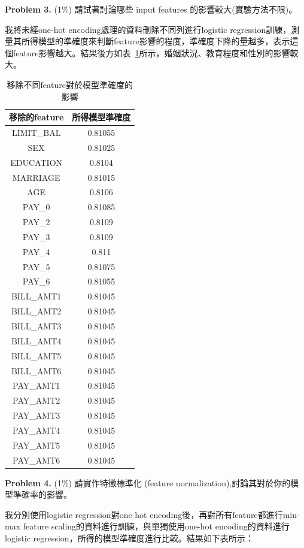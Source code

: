 \documentclass{article}
\begin{document}
\textbf{Problem 3.} (1\%) 請試著討論哪些 input features 的影響較大(實驗方法不限)。

我將未經one-hot encoding處理的資料刪除不同列進行logistic regression訓練，測量其所得模型的準確度來判斷feature影響的程度，準確度下降的量越多，表示這個feature影響越大。結果後方如表~\ref{table:feature_selection}所示，婚姻狀況、教育程度和性別的影響較大。

\begin{table}
\caption{移除不同feature對於模型準確度的影響}\label{table:feature_selection}
\begin{tabular}{|c|c|}
\hline
移除的feature & 所得模型準確度 \\
\hline
LIMIT\_BAL & 0.81055 \\
\hline
SEX & 0.81025 \\
\hline
EDUCATION & 0.8104 \\
\hline
MARRIAGE & 0.81015 \\
\hline
AGE & 0.8106 \\
\hline
PAY\_0 & 0.81085 \\
\hline
PAY\_2 & 0.8109 \\
\hline
PAY\_3 & 0.8109\\
\hline
PAY\_4 & 0.811 \\
\hline
PAY\_5 & 0.81075 \\
\hline
PAY\_6 & 0.81055 \\
\hline
BILL\_AMT1 & 0.81045 \\
\hline
BILL\_AMT2 & 0.81045 \\
\hline
BILL\_AMT3 & 0.81045 \\
\hline
BILL\_AMT4 & 0.81045 \\
\hline
BILL\_AMT5 & 0.81045 \\
\hline
BILL\_AMT6 & 0.81045 \\
\hline
PAY\_AMT1 & 0.81045 \\
\hline
PAY\_AMT2 & 0.81045 \\
\hline
PAY\_AMT3 & 0.81045 \\
\hline
PAY\_AMT4 & 0.81045 \\
\hline
PAY\_AMT5 & 0.81045 \\
\hline
PAY\_AMT6 & 0.81045 \\
\hline
\end{tabular}
\end{table}

\textbf{Problem 4.} (1\%) 請實作特徵標準化 (feature normalization),討論其對於你的模型準確率的影響。

我分別使用logistic regression對one hot encoding後，再對所有feature都進行min-max feature scaling的資料進行訓練，與單獨使用one-hot encoding的資料進行logistic regression，所得的模型準確度進行比較。結果如下表所示：
\end{document}

